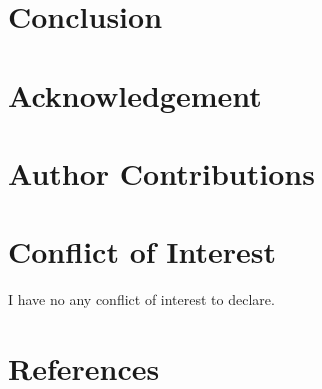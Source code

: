 \documentclass[number,preprint,review]{elsarticle}
\begin{document}
\section{Conclusion}
\label{conclusion}




\section*{Acknowledgement}

\section*{Author Contributions}

\section*{Conflict of Interest}

I have no any conflict of interest to declare. 




\section*{References}



\end{document}

